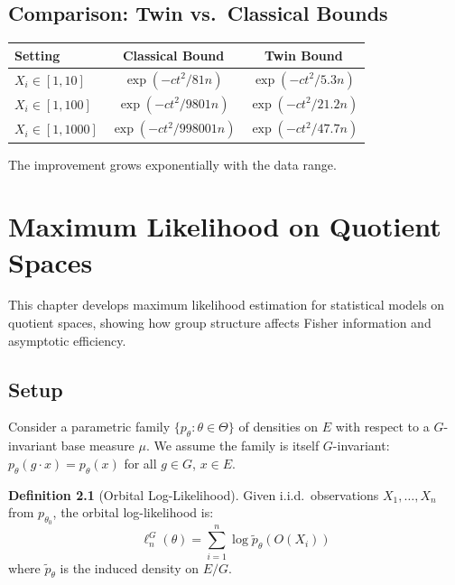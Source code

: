 \documentclass[11pt,twoside,openright]{book}
\theoremstyle{plain}
\theoremstyle{definition}
\newtheorem{definition}[theorem]{Definition}
\theoremstyle{remark}
\begin{document}
\section{Comparison: Twin vs.\ Classical Bounds}

\begin{center}
\begin{tabular}{lcc}
\toprule
Setting & Classical Bound & Twin Bound \\
\midrule
$X_i \in [1, 10]$ & $\exp(-ct^2/81n)$ & $\exp(-ct^2/5.3n)$ \\
$X_i \in [1, 100]$ & $\exp(-ct^2/9801n)$ & $\exp(-ct^2/21.2n)$ \\
$X_i \in [1, 1000]$ & $\exp(-ct^2/998001n)$ & $\exp(-ct^2/47.7n)$ \\
\bottomrule
\end{tabular}
\end{center}

The improvement grows exponentially with the data range.


\chapter{Maximum Likelihood on Quotient Spaces}
\label{ch:mle}

This chapter develops maximum likelihood estimation for statistical models on quotient spaces, showing how group structure affects Fisher information and asymptotic efficiency.

\section{Setup}

Consider a parametric family $\{p_\theta : \theta \in \Theta\}$ of densities on $E$ with respect to a $G$-invariant base measure $\mu$. We assume the family is itself $G$-invariant: $p_\theta(g \cdot x) = p_\theta(x)$ for all $g \in G$, $x \in E$.

\begin{definition}[Orbital Log-Likelihood]
Given i.i.d.\ observations $X_1, \ldots, X_n$ from $p_{\theta_0}$, the orbital log-likelihood is:
\begin{equation}
\ell_n^G(\theta) = \sum_{i=1}^n \log \tilde{p}_\theta(O(X_i))
\label{eq:orbital-loglik}
\end{equation}
where $\tilde{p}_\theta$ is the induced density on $E/G$.
\end{definition}
\end{document}
